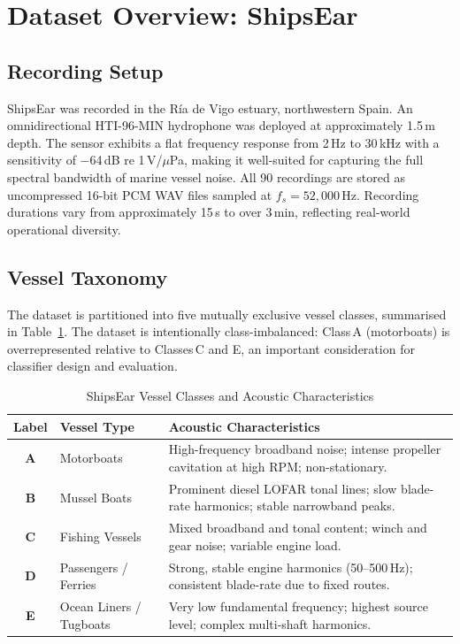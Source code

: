 \documentclass[conference]{IEEEtran}
\begin{document}
% 
\section{Dataset Overview: ShipsEar}

\subsection{Recording Setup}

ShipsEar was recorded in the R\'ia de Vigo estuary, northwestern Spain.
An omnidirectional HTI-96-MIN hydrophone was deployed at approximately
1.5\,m depth. The sensor exhibits a flat frequency response from 2\,Hz
to 30\,kHz with a sensitivity of $-$64\,dB re 1\,V/$\mu$Pa, making it
well-suited for capturing the full spectral bandwidth of marine vessel noise.
All 90 recordings are stored as uncompressed 16-bit PCM WAV files sampled at
$f_s = 52{,}000$\,Hz. Recording durations vary from approximately 15\,s to
over 3\,min, reflecting real-world operational diversity.

\subsection{Vessel Taxonomy}

The dataset is partitioned into five mutually exclusive vessel classes,
summarised in Table~\ref{tab:classes}. The dataset is intentionally
class-imbalanced: Class\,A (motorboats) is overrepresented relative to
Classes\,C and E, an important consideration for classifier design and
evaluation.

\begin{table}[ht]
  \caption{ShipsEar Vessel Classes and Acoustic Characteristics}
  \label{tab:classes}
  \centering
  \setlength{\tabcolsep}{4pt}
  \begin{tabular}{>{\bfseries}c l p{4.6cm}}
    \toprule
    \textbf{Label} & \textbf{Vessel Type} & \textbf{Acoustic Characteristics} \\
    \midrule
    A & Motorboats
      & High-frequency broadband noise; intense propeller cavitation at high RPM; non-stationary. \\[4pt]
    B & Mussel Boats
      & Prominent diesel LOFAR tonal lines; slow blade-rate harmonics; stable narrowband peaks. \\[4pt]
    C & Fishing Vessels
      & Mixed broadband and tonal content; winch and gear noise; variable engine load. \\[4pt]
    D & Passengers / Ferries
      & Strong, stable engine harmonics (50--500\,Hz); consistent blade-rate due to fixed routes. \\[4pt]
    E & Ocean Liners / Tugboats
      & Very low fundamental frequency; highest source level; complex multi-shaft harmonics. \\
    \bottomrule
  \end{tabular}
\end{table}
\end{document}
